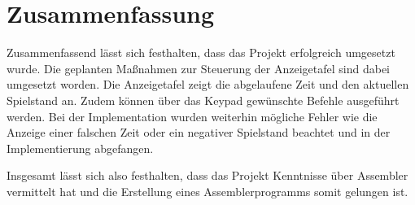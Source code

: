 \chapter{Zusammenfassung}
\label{cha:Zusammenfassung}

Zusammenfassend lässt sich festhalten, dass das Projekt erfolgreich umgesetzt wurde. Die geplanten Maßnahmen zur Steuerung der Anzeigetafel sind dabei umgesetzt worden. Die Anzeigetafel zeigt die abgelaufene Zeit und den aktuellen Spielstand an. Zudem können über das Keypad gewünschte Befehle ausgeführt werden. Bei der Implementation wurden weiterhin mögliche Fehler wie die Anzeige einer falschen Zeit oder ein negativer Spielstand beachtet und in der Implementierung abgefangen. 

Insgesamt lässt sich also festhalten, dass das Projekt Kenntnisse über Assembler vermittelt hat und die Erstellung eines Assemblerprogramms somit gelungen ist.

